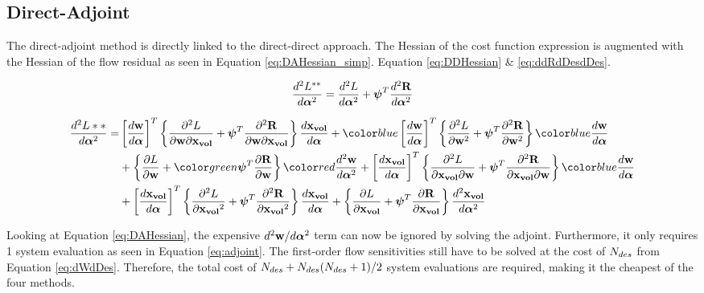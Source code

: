 \documentclass[letterpaper,12pt,]{article}
\begin{document}
\newpage
\subsection*{Direct-Adjoint}

The direct-adjoint method is directly linked to the direct-direct approach.
The Hessian of the cost function expression is augmented with the Hessian of the flow residual as seen in Equation \ref{eq:DAHessian_simp}.
Equation \ref{eq:DDHessian} \& \ref{eq:ddRdDesdDes}.

\begin{equation}
\begin{split}
	\dfrac{d^2L^{**}}{d\boldsymbol{\alpha}^2} 
	=
	\dfrac{d^2L}{d\boldsymbol{\alpha}^2} 
	+
	\boldsymbol{\psi}^T
	\dfrac{d^2\mathbf{R}}{d\boldsymbol{\alpha}^2} 
\label{eq:DAHessian_simp}
\end{split}
\end{equation}

\begin{equation}
\begin{split}
	\DDt{L**}{\balfa} 
	=&
	\trans{\Dt{\bw}{\balfa}}
	\left\{
		\ddelm{L}{\bw}{\xvol}
		+
		\bpsi^T
		\ddelm{\bR}{\bw}{\xvol}
	\right\}
	\Dt{\xvol}{\balfa}
	+
	\blue{\trans{\Dt{\bw}{\balfa}}}
	\left\{
		\ddel{L}{\bw}
		+
		\bpsi^T
		\ddel{\bR}{\bw}
	\right\}
	\blue{\Dt{\bw}{\balfa}}
	\\&+
	\left\{
		\del{L}{\bw}
		+
		\green{\bpsi^T}
		\del{\bR}{\bw}
	\right\}
	\red{\DDt{\bw}{\balfa}}
	+
	\trans{\Dt{\xvol}{\balfa}}
	\left\{
		\ddelm{L}{\xvol}{\bw}
		+
		\bpsi^T
		\ddelm{\bR}{\xvol}{\bw}
	\right\}
	\blue{\Dt{\bw}{\balfa}}
	\\&+
	\trans{\Dt{\xvol}{\balfa}}
	\left\{
		\ddel{L}{\xvol}
		+
		\bpsi^T
		\ddel{\bR}{\xvol}
	\right\}
	\Dt{\xvol}{\balfa}
	+
	\left\{
		\del{L}{\xvol}
		+
		\bpsi^T
		\del{\bR}{\xvol}
	\right\}
	\DDt{\xvol}{\balfa}
\label{eq:DAHessian}
\end{split}
\end{equation}

Looking at Equation \ref{eq:DAHessian}, the expensive $d^2\mathbf{w}/d\boldsymbol{\alpha}^2$ term can now be ignored by solving the adjoint.
Furthermore, it only requires 1 system evaluation as seen in Equation \ref{eq:adjoint}.
The first-order flow sensitivities still have to be solved at the cost of $N_{des}$ from Equation \ref{eq:dWdDes}.
Therefore, the total cost of $N_{des} + N_{des}(N_{des}+1)/2$ system evaluations are required, making it the cheapest of the four methods.
\end{document}
